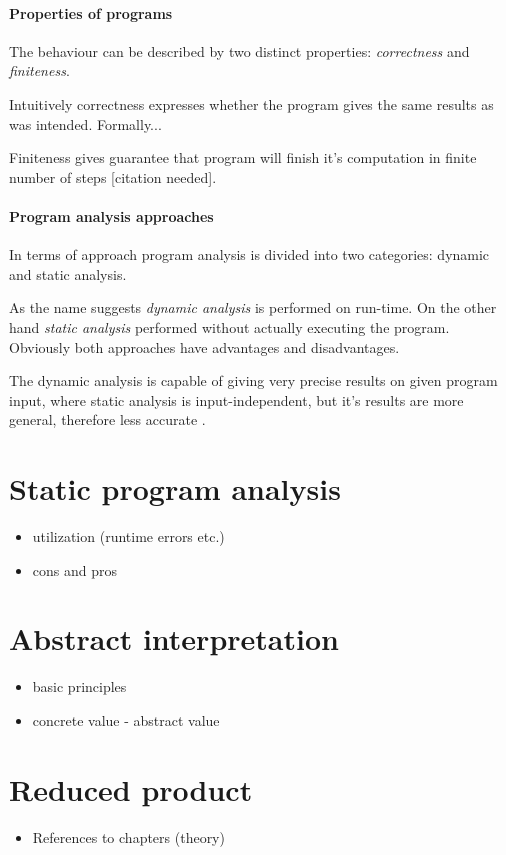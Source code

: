 \documentclass[12pt,oneside,draft]{fithesis2}
\begin{document}
\paragraph{Properties of programs}
The behaviour can be described by two distinct properties: \textit{correctness} and \textit{finiteness}.

Intuitively correctness expresses whether the program gives the same results as was intended. Formally...

Finiteness gives guarantee that program will finish it's computation in finite number of steps [citation needed].

\paragraph{Program analysis approaches}
In terms of approach program analysis is divided into two categories: dynamic and static analysis.

As the name suggests \textit{dynamic analysis} is performed on run-time. On the other hand \textit{static analysis} performed without actually executing the program. Obviously both approaches have advantages and disadvantages.

The dynamic analysis is capable of giving very precise results on given program input, where static analysis is input-independent, but it's results are more general, therefore less accurate \cite{CousotEtAl06-ASIAN}.

\section{Static program analysis}
\begin{itemize}
  \item utilization (runtime errors etc.)
  \item cons and pros
\end{itemize}

\section{Abstract interpretation}
\begin{itemize}
  \item basic principles
  \item concrete value - abstract value
\end{itemize}

\section{Reduced product}
\begin{itemize}
  \item References to chapters (theory)
\end{itemize}
\end{document}
